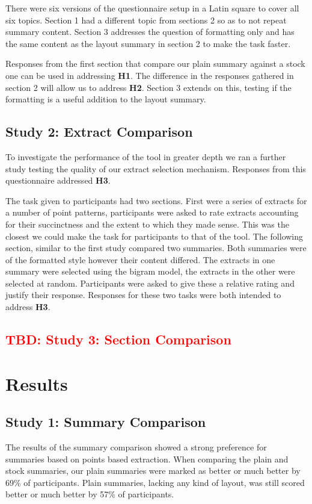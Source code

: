      There were six versions of the questionnaire setup in a Latin square to cover all six topics. Section 1 had a different topic from sections 2 so as to not repeat summary content. Section 3 addresses the question of formatting only and has the same content as the layout summary in section 2 to make the task faster.

      Responses from the first section that compare our plain summary against a stock one can be used in addressing \textbf{H1}. The difference in the responses gathered in section 2 will allow us to address \textbf{H2}. Section 3 extends on this, testing if the formatting is a useful addition to the layout summary.

    \tocless\subsection{Study 2: Extract Comparison}
      To investigate the performance of the tool in greater depth we ran a further study testing the quality of our extract selection mechanism. Responses from this questionnaire addressed \textbf{H3}.

      The task given to participants had two sections. First were a series of extracts for a number of point patterns, participants were asked to rate extracts accounting for their succinctness and the extent to which they made sense. This was the closest we could make the task for participants to that of the tool. The following section, similar to the first study compared two summaries. Both summaries were of the formatted style however their content differed. The extracts in one summary were selected using the bigram model, the extracts in the other were selected at random. Participants were asked to give these a relative rating and justify their response. Responses for these two tasks were both intended to address \textbf{H3}.

    \tocless\subsection{\textcolor{red}{TBD: Study 3: Section Comparison}}

  \section{Results}
    \subsection{Study 1: Summary Comparison}
      The results of the summary comparison showed a strong preference for summaries based on points based extraction. When comparing the plain and stock summaries, our plain summaries were marked as better or much better by 69\% of participants. Plain summaries, lacking any kind of layout, was still scored better or much better by 57\% of participants.

